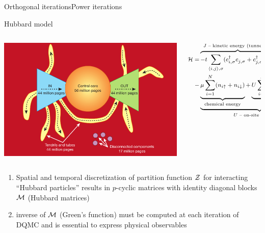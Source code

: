\documentclass[xcolor=table,final]{beamer} %
\begin{document}
\begin{frame}{Orthogonal iterations}{Power iterations}
  \begin{block}{Hubbard model}
    \begin{columns}
      \begin{column}{0.35\textwidth}
        \includegraphics[width=1.\textwidth]{figs/pdf/WebBowTie}
      \end{column}
      \begin{column}{0.7\textwidth}
        \begin{equation*}
          \footnotesize
          \begin{split}
            {\cal H} =& 
            \overbrace{
              -t \sum_{\langle i,j \rangle,\sigma} 
              (c^{\dagger}_{i,\sigma} c^{}_{j,\sigma}+ c^{\dagger}_{j,\sigma}c^{}_{i,\sigma})%
            }^{\text{$J$ -- kinetic energy (tunneling)}} - 
            \\ -&
            \underbrace{
              \underbrace{
                \mu \sum_{i=1}^{N} (n_{i\uparrow} + n_{i\downarrow})%
              }_{\text{chemical energy}} +
              \underbrace{
                U \sum_{i=1}^{N} (n_{i\uparrow} -\frac{1}{2}) (n_{i\downarrow}-\frac{1}{2})%
              }_{\text{potential energy}}
            }_{\text{$U$ -- on-site interaction}},
          \end{split}
        \end{equation*}
      \end{column}
    \end{columns}
  \end{block}
  \pause
  \begin{enumerate}
  \item 
    \alert{Spatial and temporal discretization} of partition function $\cal Z$
    for interacting ``Hubbard particles''
    results in \alert{$p$-cyclic matrices} with identity diagonal blocks 
    \alert{$\cal M$} (Hubbard matrices)
  \item 
    \alert{inverse of $\cal M$} (Green’s function)
    must be computed \alert{at each iteration} of DQMC
    and is essential to express physical observables
  \end{enumerate} 
\end{frame}
\end{document}

